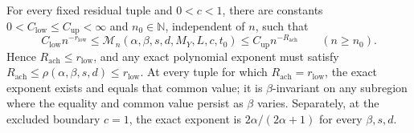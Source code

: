 For every fixed residual tuple and \(0<c<1\), there are constants \(0<C_{\mathrm{low}}\le C_{\mathrm{up}}<\infty\) and \(n_0\in\mathbb N\), independent of \(n\), such that \[C_{\mathrm{low}}n^{-r_{\mathrm{low}}}\le\mathcal M_n(\alpha,\beta,s,d,M_Y,L,c,t_0)\le C_{\mathrm{up}}n^{-R_{\mathrm{ach}}}\qquad(n\ge n_0).\] Hence \(R_{\mathrm{ach}}\le r_{\mathrm{low}}\), and any exact polynomial exponent must satisfy \(R_{\mathrm{ach}}\le\rho(\alpha,\beta,s,d)\le r_{\mathrm{low}}\). At every tuple for which \(R_{\mathrm{ach}}=r_{\mathrm{low}}\), the exact exponent exists and equals that common value; it is \(\beta\)-invariant on any subregion where the equality and common value persist as \(\beta\) varies. Separately, at the excluded boundary \(c=1\), the exact exponent is \(2\alpha/(2\alpha+1)\) for every \(\beta,s,d\).